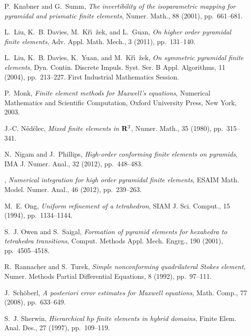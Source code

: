\documentclass[twoside,reqno,final]{amsart}
\begin{document}
\begin{thebibliography}{10}
{\sc P.~Knabner and G.~Summ}, {\em The invertibility of the isoparametric
  mapping for pyramidal and prismatic finite elements}, Numer. Math., 88
  (2001), pp.~661--681.

{\sc L.~Liu, K.~B. Davies, M.~K\v r\'\i~\v zek, and L.~Guan}, {\em On higher
  order pyramidal finite elements}, Adv. Appl. Math. Mech., 3 (2011),
  pp.~131--140.

{\sc L.~Liu, K.~B. Davies, K.~Yuan, and M.~K\v r\'\i~\v zek}, {\em On symmetric
  pyramidal finite elements}, Dyn. Contin. Discrete Impuls. Syst. Ser. B Appl.
  Algorithms, 11 (2004), pp.~213--227.
\newblock First Industrial Mathematics Session.

{\sc P.~Monk}, {\em Finite element methods for {M}axwell's equations},
  Numerical Mathematics and Scientific Computation, Oxford University Press,
  New York, 2003.

{\sc J.-C. N{\'e}d{\'e}lec}, {\em Mixed finite elements in {${\bf R}\sp{3}$}},
  Numer. Math., 35 (1980), pp.~315--341.

{\sc N.~Nigam and J.~Phillips}, {\em High-order conforming finite elements on
  pyramids}, IMA J. Numer. Anal., 32 (2012), pp.~448--483.

\leavevmode\vrule height 2pt depth -1.6pt width 23pt, {\em Numerical
  integration for high order pyramidal finite elements}, ESAIM Math. Model.
  Numer. Anal., 46 (2012), pp.~239--263.

{\sc M.~E. Ong}, {\em Uniform refinement of a tetrahedron}, SIAM J. Sci.
  Comput., 15 (1994), pp.~1134--1144.

{\sc S.~J. Owen and S.~Saigal}, {\em Formation of pyramid elements for
  hexahedra to tetrahedra transitions}, Comput. Methods Appl. Mech. Engrg., 190
  (2001), pp.~4505--4518.

{\sc R.~Rannacher and S.~Turek}, {\em Simple nonconforming quadrilateral
  {S}tokes element}, Numer. Methods Partial Differential Equations, 8 (1992),
  pp.~97--111.

{\sc J.~Sch\"oberl}, {\em A posteriori error estimates for {M}axwell
  equations}, Math. Comp., 77 (2008), pp.~633--649.

{\sc S.~J. Sherwin}, {\em Hierarchical {$hp$} finite elements in hybrid
  domains}, Finite Elem. Anal. Des., 27 (1997), pp.~109--119.


\end{thebibliography}
\end{document}

